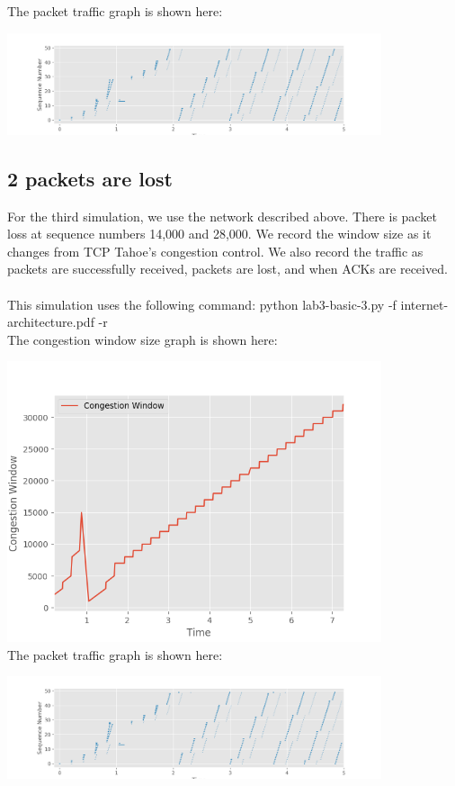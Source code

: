 \documentclass[fleqn,11pt]{article}
\begin{document}
The packet traffic graph is shown here:

\includegraphics[width=11cm]{sequence2}\\

\subsection{2 packets are lost}
For the third simulation, we use the network described above. There is packet loss at sequence numbers 14,000 and 28,000. We record the window size as it changes from TCP Tahoe's congestion control. We also record the traffic as packets are successfully received, packets are lost, and when ACKs are received.\\\\
This simulation uses the following command: python lab3-basic-3.py -f internet-architecture.pdf -r\\

The congestion window size graph is shown here:

\includegraphics[width=11cm]{cwnd3}\\

The packet traffic graph is shown here:

\includegraphics[width=11cm]{sequence3}\\
\end{document}
